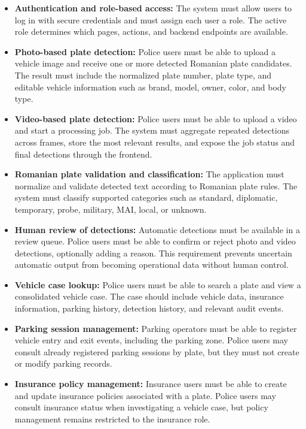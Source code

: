 ﻿\documentclass[12pt,a4paper]{article}
\begin{document}
\begin{itemize}
  \item \textbf{Authentication and role-based access:} The system must allow users to log in with secure credentials and must assign each user a role. The active role determines which pages, actions, and backend endpoints are available.

  \item \textbf{Photo-based plate detection:} Police users must be able to upload a vehicle image and receive one or more detected Romanian plate candidates. The result must include the normalized plate number, plate type, and editable vehicle information such as brand, model, owner, color, and body type.

  \item \textbf{Video-based plate detection:} Police users must be able to upload a video and start a processing job. The system must aggregate repeated detections across frames, store the most relevant results, and expose the job status and final detections through the frontend.

  \item \textbf{Romanian plate validation and classification:} The application must normalize and validate detected text according to Romanian plate rules. The system must classify supported categories such as standard, diplomatic, temporary, probe, military, MAI, local, or unknown.

  \item \textbf{Human review of detections:} Automatic detections must be available in a review queue. Police users must be able to confirm or reject photo and video detections, optionally adding a reason. This requirement prevents uncertain automatic output from becoming operational data without human control.

  \item \textbf{Vehicle case lookup:} Police users must be able to search a plate and view a consolidated vehicle case. The case should include vehicle data, insurance information, parking history, detection history, and relevant audit events.

  \item \textbf{Parking session management:} Parking operators must be able to register vehicle entry and exit events, including the parking zone. Police users may consult already registered parking sessions by plate, but they must not create or modify parking records.

  \item \textbf{Insurance policy management:} Insurance users must be able to create and update insurance policies associated with a plate. Police users may consult insurance status when investigating a vehicle case, but policy management remains restricted to the insurance role.


\end{itemize}
\end{document}
